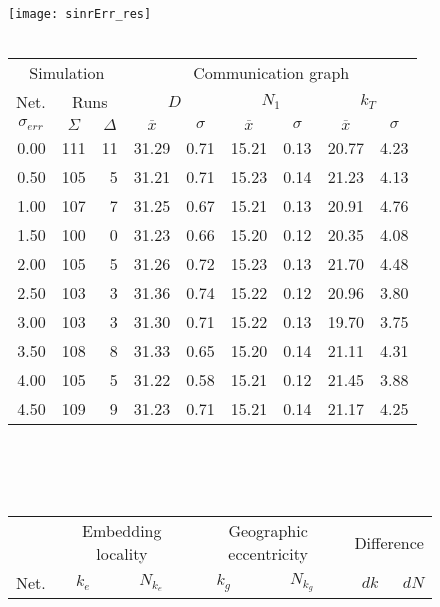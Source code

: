 \documentclass{article}
\begin{document}
\begin{figure}[h]
\begin{center}
\texttt{[image: sinrErr\_res]}
~\\~\\
\begin{tabular}{|r|rr|rr|rr|rr|}
\hline
\multicolumn{3}{|c|}{Simulation} & \multicolumn{6}{|c|}{Communication graph}\\
\multicolumn{1}{|c}{Net.} & \multicolumn{2}{c|}{Runs} & \multicolumn{2}{|c}{$D$} & \multicolumn{2}{c}{$N_1$} & \multicolumn{2}{c|}{$k_T$}\\
\hline
\multicolumn{1}{|c|}{$\sigma_{err}$} & \multicolumn{1}{|c}{$\Sigma$} & \multicolumn{1}{c|}{$\Delta$} & \multicolumn{1}{|c}{$\overline{x}$} & \multicolumn{1}{c|}{$\sigma$} & \multicolumn{1}{|c}{$\overline{x}$} & \multicolumn{1}{c|}{$\sigma$} & \multicolumn{1}{|c}{$\overline{x}$} & \multicolumn{1}{c|}{$\sigma$}\\
0.00 & 111 & 11 & 31.29 & 0.71 & 15.21 & 0.13 & 20.77 & 4.23\\
0.50 & 105 &  5 & 31.21 & 0.71 & 15.23 & 0.14 & 21.23 & 4.13\\
1.00 & 107 &  7 & 31.25 & 0.67 & 15.21 & 0.13 & 20.91 & 4.76\\
1.50 & 100 &  0 & 31.23 & 0.66 & 15.20 & 0.12 & 20.35 & 4.08\\
2.00 & 105 &  5 & 31.26 & 0.72 & 15.23 & 0.13 & 21.70 & 4.48\\
2.50 & 103 &  3 & 31.36 & 0.74 & 15.22 & 0.12 & 20.96 & 3.80\\
3.00 & 103 &  3 & 31.30 & 0.71 & 15.22 & 0.13 & 19.70 & 3.75\\
3.50 & 108 &  8 & 31.33 & 0.65 & 15.20 & 0.14 & 21.11 & 4.31\\
4.00 & 105 &  5 & 31.22 & 0.58 & 15.21 & 0.12 & 21.45 & 3.88\\
4.50 & 109 &  9 & 31.23 & 0.71 & 15.21 & 0.14 & 21.17 & 4.25\\
\hline
\end{tabular}\\
~\\~\\
\begin{tabular}{|r|rr|rr|rr|rr|rr|}
\hline
& \multicolumn{4}{|c|}{Embedding locality} & \multicolumn{4}{|c|}{Geographic eccentricity} & \multicolumn{2}{|c|}{Difference}\\
Net. & \multicolumn{2}{c}{$k_e$} & \multicolumn{2}{c|}{$N_{k_e}$} & \multicolumn{2}{c}{$k_g$} & \multicolumn{2}{c|}{$N_{k_g}$}& $dk$ & $dN$\\

\end{tabular}
\end{center}
\end{figure}
\end{document}

